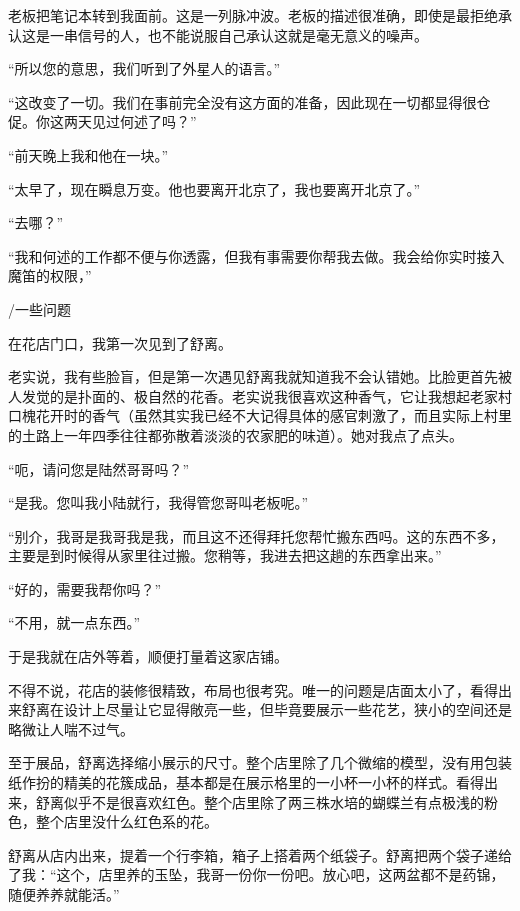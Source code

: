 \documentclass[a4paper, 10pt]{article}
\begin{document}
老板把笔记本转到我面前。这是一列脉冲波。老板的描述很准确，即使是最拒绝承认这是一串信号的人，也不能说服自己承认这就是毫无意义的噪声。

“所以您的意思，我们听到了外星人的语言。”

“这改变了一切。我们在事前完全没有这方面的准备，因此现在一切都显得很仓促。你这两天见过何述了吗？”

“前天晚上我和他在一块。”

“太早了，现在瞬息万变。他也要离开北京了，我也要离开北京了。”

“去哪？”

“我和何述的工作都不便与你透露，但我有事需要你帮我去做。我会给你实时接入魔笛的权限，”

\vspace{10pt}

/一些问题

\vspace{10pt}

在花店门口，我第一次见到了舒离。

老实说，我有些脸盲，但是第一次遇见舒离我就知道我不会认错她。比脸更首先被人发觉的是扑面的、极自然的花香。老实说我很喜欢这种香气，它让我想起老家村口槐花开时的香气（虽然其实我已经不大记得具体的感官刺激了，而且实际上村里的土路上一年四季往往都弥散着淡淡的农家肥的味道）。她对我点了点头。

“呃，请问您是陆然哥哥吗？”

“是我。您叫我小陆就行，我得管您哥叫老板呢。”

“别介，我哥是我哥我是我，而且这不还得拜托您帮忙搬东西吗。这的东西不多，主要是到时候得从家里往过搬。您稍等，我进去把这趟的东西拿出来。”

“好的，需要我帮你吗？”

“不用，就一点东西。”

于是我就在店外等着，顺便打量着这家店铺。

不得不说，花店的装修很精致，布局也很考究。唯一的问题是店面太小了，看得出来舒离在设计上尽量让它显得敞亮一些，但毕竟要展示一些花艺，狭小的空间还是略微让人喘不过气。

至于展品，舒离选择缩小展示的尺寸。整个店里除了几个微缩的模型，没有用包装纸作扮的精美的花簇成品，基本都是在展示格里的一小杯一小杯的样式。看得出来，舒离似乎不是很喜欢红色。整个店里除了两三株水培的蝴蝶兰有点极浅的粉色，整个店里没什么红色系的花。

舒离从店内出来，提着一个行李箱，箱子上搭着两个纸袋子。舒离把两个袋子递给了我：“这个，店里养的玉坠，我哥一份你一份吧。放心吧，这两盆都不是药锦，随便养养就能活。”
\end{document}
